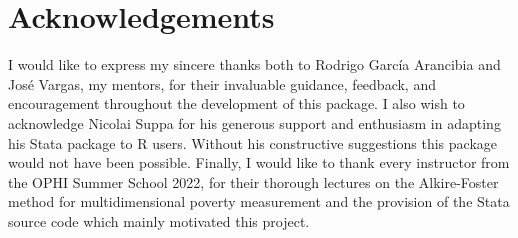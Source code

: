 \section{Acknowledgements}\label{acknowledgements}

I would like to express my sincere thanks both to Rodrigo García Arancibia and José Vargas, my mentors, for their invaluable guidance, feedback, and encouragement throughout the development of this package. I also wish to acknowledge Nicolai Suppa for his generous support and enthusiasm in adapting his Stata package to R users. Without his constructive suggestions this package would not have been possible. Finally, I would like to thank every instructor from the OPHI Summer School 2022, for their thorough lectures on the Alkire-Foster method for multidimensional poverty measurement and the provision of the Stata source code which mainly motivated this project.



\address{%
Ignacio Girela\\
CONICET, Universidad Nacional de Córdoba\\%
Facultad de Ciencias Económicas, Bv. Enrique Barros s/n\\ Córdoba, Argentina\\
%
\url{https://github.com/girelaignacio}\\%
\textit{ORCiD: \href{https://orcid.org/0000-0003-3297-3854}{0000-0003-3297-3854}}\\%
\href{mailto:ignacio.girela@unc.edu.ar}{\nolinkurl{ignacio.girela@unc.edu.ar}}%
}
